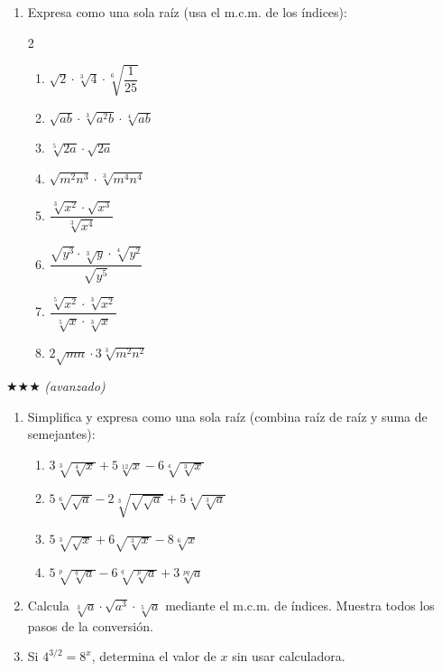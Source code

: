 \documentclass[11pt, letterpaper]{article}
\begin{document}
\begin{enumerate}[label=\textbf{\arabic*.}, leftmargin=*, resume]
  \item Expresa como una sola raíz (usa el m.c.m. de los índices):
  \begin{multicols}{2}
  \begin{enumerate}[label=\alph*)]
    \item $\sqrt{2}\cdot\sqrt[3]{4}\cdot\sqrt[6]{\dfrac{1}{25}}$
    \item $\sqrt{ab}\cdot\sqrt[3]{a^2b}\cdot\sqrt[4]{ab}$
    \item $\sqrt[5]{2a}\cdot\sqrt{2a}$
    \item $\sqrt{m^2n^3}\cdot\sqrt[3]{m^4n^4}$
    \item $\dfrac{\sqrt[3]{x^2}\cdot\sqrt{x^3}}{\sqrt[3]{x^4}}$
    \item $\dfrac{\sqrt{y^3}\cdot\sqrt[3]{y}\cdot\sqrt[4]{y^2}}{\sqrt{y^5}}$
    \item $\dfrac{\sqrt[5]{x^2}\cdot\sqrt[3]{x^2}}{\sqrt[5]{x}\cdot\sqrt[3]{x}}$
    \item $2\sqrt{mn}\cdot 3\sqrt[3]{m^2n^2}$
  \end{enumerate}
  \end{multicols}
\end{enumerate}

$\bigstar\bigstar\bigstar$ \textit{(avanzado)}

\begin{enumerate}[label=\textbf{\arabic*.}, leftmargin=*, resume]
  \item Simplifica y expresa como una sola raíz (combina raíz de raíz y suma de semejantes):
  \begin{enumerate}[label=\alph*)]
    \item $3\sqrt[3]{\sqrt[4]{x}}+5\sqrt[12]{x}-6\sqrt[4]{\sqrt[3]{x}}$
    \item $5\sqrt[6]{\sqrt{a}}-2\sqrt[3]{\sqrt{\sqrt{a}}}+5\sqrt[4]{\sqrt[3]{a}}$
    \item $5\sqrt[3]{\sqrt{x}}+6\sqrt{\sqrt[3]{x}}-8\sqrt[6]{x}$
    \item $5\sqrt[p]{\sqrt[q]{a}}-6\sqrt[q]{\sqrt[p]{a}}+3\sqrt[pq]{a}$
  \end{enumerate}

  \item Calcula $\sqrt[3]{a}\cdot\sqrt{a^3}\cdot\sqrt[5]{a}$ mediante el m.c.m. de índices. Muestra todos los pasos de la conversión.

  \item Si $4^{3/2} = 8^x$, determina el valor de $x$ sin usar calculadora.
\end{enumerate}
\end{document}
